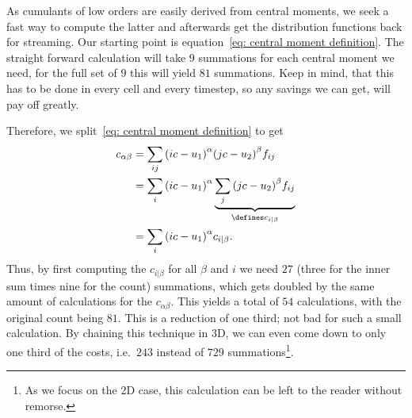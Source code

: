 
As cumulants of low orders are easily derived from central moments, we seek a fast way to compute the latter and afterwards get the distribution functions back for streaming.
Our starting point is equation~\eqref{eq: central moment definition}.
The straight forward calculation will take $9$ summations for each central moment we need, for the full set of $9$ this will yield $81$ summations.
Keep in mind, that this has to be done in every cell and every timestep, so any savings we can get, will pay off greatly.

Therefore, we split~\eqref{eq: central moment definition} to get
\begin{equation}
  \begin{aligned}
    c_{\alpha\beta}
    & = \sum_{ij} {\left(ic-u_1\right)}^\alpha {\left(jc-u_2\right)}^\beta f_{ij} \\
    & = \sum_{i} {\left(ic-u_1\right)}^\alpha \underbrace{\sum_{j} {\left(jc-u_2\right)}^\beta f_{ij}}_{\defines c_{i|\beta}} \\
    & = \sum_{i} {\left(ic-u_1\right)}^\alpha c_{i|\beta}.
  \end{aligned}
\end{equation}
Thus, by first computing the $c_{i|\beta}$ for all $\beta$ and $i$ we need $27$ (three for the inner sum times nine for the count) summations, which gets doubled by the same amount of calculations for the $c_{\alpha\beta}$.
This yields a total of $54$ calculations, with the original count being $81$.
This is a reduction of one third; not bad for such a small calculation.
By chaining this technique in 3D, we can even come down to only one third of the costs, i.e.\ $243$ instead of $729$ summations\footnote{As we focus on the 2D case, this calculation can be left to the reader without remorse.}.

